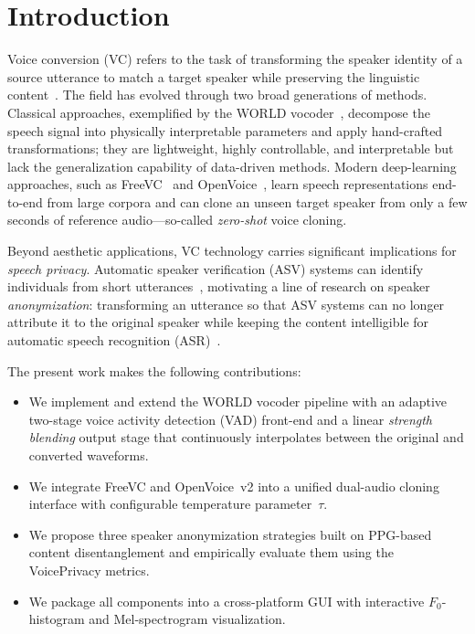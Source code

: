 \documentclass[conference]{IEEEtran}
\begin{document}
\section{Introduction}

Voice conversion (VC) refers to the task of transforming the speaker
identity of a source utterance to match a target speaker while
preserving the linguistic content~\cite{b_vc_survey}.
The field has evolved through two broad generations of methods.
Classical approaches, exemplified by the WORLD vocoder~\cite{b_world},
decompose the speech signal into physically interpretable parameters
and apply hand-crafted transformations; they are lightweight, highly
controllable, and interpretable but lack the generalization capability
of data-driven methods.
Modern deep-learning approaches, such as FreeVC~\cite{b_freevc}
and OpenVoice~\cite{b_openvoice}, learn speech representations
end-to-end from large corpora and can clone an unseen target speaker
from only a few seconds of reference audio---so-called \emph{zero-shot}
voice cloning.

Beyond aesthetic applications, VC technology carries significant
implications for \emph{speech privacy}.
Automatic speaker verification (ASV) systems can identify individuals
from short utterances~\cite{b_xvector}, motivating a line of research
on speaker \emph{anonymization}: transforming an utterance so that ASV
systems can no longer attribute it to the original speaker while keeping
the content intelligible for automatic speech recognition
(ASR)~\cite{b_voiceprivacy2020}.

The present work makes the following contributions:
\begin{itemize}
  \item We implement and extend the WORLD vocoder pipeline with an
        adaptive two-stage voice activity detection (VAD)
        front-end and a linear \emph{strength blending} output stage
        that continuously interpolates between the original and converted
        waveforms.
  \item We integrate FreeVC and OpenVoice~v2 into a unified dual-audio
        cloning interface with configurable temperature parameter~$\tau$.
  \item We propose three speaker anonymization strategies built on
        PPG-based content disentanglement and empirically evaluate
        them using the VoicePrivacy metrics.
  \item We package all components into a cross-platform GUI with
        interactive $F_0$-histogram and Mel-spectrogram visualization.
\end{itemize}
\end{document}

